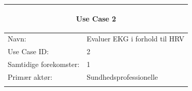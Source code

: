 \begin{table}[H] %
    \begin{tabularx}{\textwidth}{l X}
    \toprule 
    \multicolumn{2}{c}{\begin{large}\textbf{Use Case 2}\end{large}}
 \\ \midrule \addlinespace[1mm]                                                                                                                                                        
     Navn:                  &  Evaluer EKG i forhold til HRV \\ \addlinespace[1mm]                                                                                                                                                       
     Use Case ID:           & 2                                                                                                                                                                                                                                                                                                                                                                                                                                                                                                                                                                                                                         \\ \addlinespace[1mm]                                                                                                                                                       
     Samtidige forekomster: & 1                                                                                                                                                                                                                                                                                                                                                                                                                                                                                                                                                                                                                         \\ \addlinespace[1mm]                                                                                                                                                       
     Primær aktør:          &	Sundhedsprofessionelle                                                                                                                                                                                                                                                                                                                                                                                                                                                                                                                                                                                                                 \\ \addlinespace[1mm] 	                                                                                                                                                      

\end{tabularx}
\end{table}
